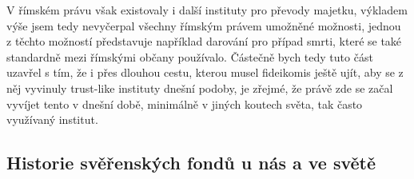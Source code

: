 \documentclass{article}
\begin{document}
V římském právu však existovaly i další instituty pro převody majetku, výkladem výše jsem tedy nevyčerpal všechny římským právem umožněné mož\-nosti, jednou z těchto možností představuje například darování pro případ smrti, které se také standardně mezi římskými občany používalo. Částečně bych tedy tuto část uzavřel s tím, že i přes dlouhou cestu, kterou musel fideikomis ještě ujít, aby se z něj vyvinuly trust-like instituty dnešní podoby, je zřejmé, že právě zde se začal vyvíjet tento v dnešní době, minimálně v jiných koutech světa, tak často využívaný institut.\\







\subsection{Historie svěřenských fondů u nás a ve světě}
\end{document}
